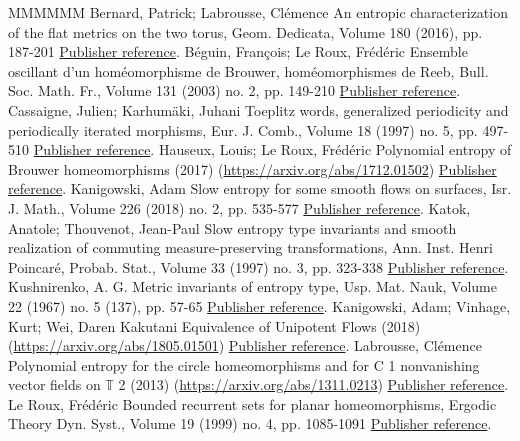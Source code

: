 \documentclass[11pt]{article}
\theoremstyle{definition}
\numberwithin{equation}{section}
\numberwithin{figure}{section}
\numberwithin{table}{section}
\begin{document}
\begin{thebibliography}{MMMMMM}
 Bernard, Patrick; Labrousse, Clémence An entropic characterization of the flat metrics on the two torus, Geom. Dedicata, Volume 180 (2016), pp. 187-201 \href{https://ahl.centre-mersenne.org/item/AHL_2019__2__39_0/#BerLab16}{Publisher reference}.
 Béguin, François; Le Roux, Frédéric Ensemble oscillant d’un homéomorphisme de Brouwer, homéomorphismes de Reeb, Bull. Soc. Math. Fr., Volume 131 (2003) no. 2, pp. 149-210 \href{https://ahl.centre-mersenne.org/item/AHL_2019__2__39_0/#BegLer03}{Publisher reference}.
 Cassaigne, Julien; Karhumäki, Juhani Toeplitz words, generalized periodicity and periodically iterated morphisms, Eur. J. Comb., Volume 18 (1997) no. 5, pp. 497-510 \href{https://ahl.centre-mersenne.org/item/AHL_2019__2__39_0/#CasKar97}{Publisher reference}.
 Hauseux, Louis; Le Roux, Frédéric Polynomial entropy of Brouwer homeomorphisms (2017) (\url{https://arxiv.org/abs/1712.01502}) \href{https://ahl.centre-mersenne.org/item/AHL_2019__2__39_0/#englishversion}{Publisher reference}.
 Kanigowski, Adam Slow entropy for some smooth flows on surfaces, Isr. J. Math., Volume 226 (2018) no. 2, pp. 535-577 \href{https://ahl.centre-mersenne.org/item/AHL_2019__2__39_0/#Kan18}{Publisher reference}.
 Katok, Anatole; Thouvenot, Jean-Paul Slow entropy type invariants and smooth realization of commuting measure-preserving transformations, Ann. Inst. Henri Poincaré, Probab. Stat., Volume 33 (1997) no. 3, pp. 323-338 \href{https://ahl.centre-mersenne.org/item/AHL_2019__2__39_0/#KatTho97}{Publisher reference}.
 Kushnirenko, A. G. Metric invariants of entropy type, Usp. Mat. Nauk, Volume 22 (1967) no. 5 (137), pp. 57-65 \href{https://ahl.centre-mersenne.org/item/AHL_2019__2__39_0/#Kus67}{Publisher reference}.
 Kanigowski, Adam; Vinhage, Kurt; Wei, Daren Kakutani Equivalence of Unipotent Flows (2018) (\url{https://arxiv.org/abs/1805.01501}) \href{https://ahl.centre-mersenne.org/item/AHL_2019__2__39_0/#KVW18}{Publisher reference}.
 Labrousse, Clémence Polynomial entropy for the circle homeomorphisms and for C 1  nonvanishing vector fields on \(\mathbb{T}\) 2  (2013) (\url{https://arxiv.org/abs/1311.0213}) \href{https://ahl.centre-mersenne.org/item/AHL_2019__2__39_0/#Lab13}{Publisher reference}.
 Le Roux, Frédéric Bounded recurrent sets for planar homeomorphisms, Ergodic Theory Dyn. Syst., Volume 19 (1999) no. 4, pp. 1085-1091 \href{https://ahl.centre-mersenne.org/item/AHL_2019__2__39_0/#Ler99}{Publisher reference}.

\end{thebibliography}
\end{document}
